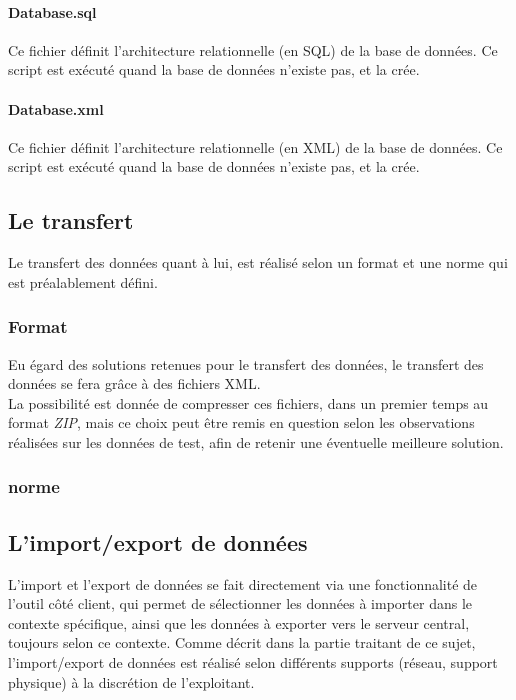 \paragraph{Database.sql}
Ce fichier définit l'architecture relationnelle (en SQL) de la base de données.
Ce script est exécuté quand la base de données n'existe pas, et la crée.

\paragraph{Database.xml}
Ce fichier définit l'architecture relationnelle (en XML) de la base de données.
Ce script est exécuté quand la base de données n'existe pas, et la crée.

\subsection{Le transfert}
Le transfert des données quant à lui, est réalisé selon un format et une norme qui est préalablement défini.

\subsubsection{Format}
Eu égard des solutions retenues pour le transfert des données, le transfert des données se fera grâce à des fichiers XML. \\
La possibilité est donnée de compresser ces fichiers, dans un premier temps au format \emph{ZIP}, mais ce choix peut être remis en question selon les observations réalisées sur les données de test, afin de retenir une éventuelle meilleure solution.

\subsubsection{norme}
% 
% 

\subsection{L'import/export de données}
L'import et l'export de données se fait directement via une fonctionnalité de l'outil côté client, qui permet de sélectionner les données à importer dans le contexte spécifique, ainsi que les données à exporter vers le serveur central, toujours selon ce contexte.
Comme décrit dans la partie traitant de ce sujet, l'import/export de données est réalisé selon différents supports (réseau, support physique) à la discrétion de l'exploitant.
